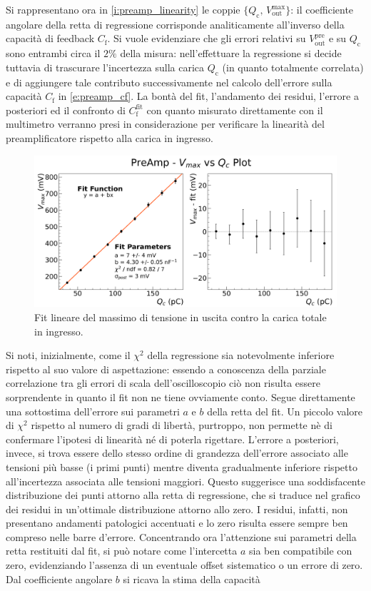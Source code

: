 \documentclass[a4paper,11pt]{article} %
\begin{document}
Si rappresentano ora in \autoref{i:preamp_linearity} le coppie $\{Q_{\text{c}},\,V^{\text{max}}_{\text{out}}\}$: il
coefficiente angolare della retta di regressione corrisponde analiticamente all'inverso della capacità di feedback
$C_{\text{f}}$. Si vuole evidenziare che gli errori relativi su $V^{\text{pre}}_{\text{out}}$ e su $Q_{\text{c}}$ sono
entrambi circa il $2\%$ della misura: nell'effettuare la regressione si decide tuttavia di trascurare l'incertezza sulla
carica $Q_{\text{c}}$ (in quanto totalmente correlata) e di aggiungere tale contributo successivamente nel calcolo
dell'errore sulla capacità $C_{\text{f}}$ in \autoref{e:preamp_cf}. La bontà del fit, l'andamento dei residui, l'errore
a posteriori ed il confronto di $C_{\text{f}}^{\text{fit}}$ con quanto misurato direttamente con il multimetro verranno
presi in considerazione per verificare la linearità del preamplificatore rispetto alla carica in ingresso. 
\vspace{-7pt}
\begin{figure}[H]
	\centering
	\includegraphics[width=0.8\linewidth]{../Plots/PreAmp/linearity_fit2.png}
	\vspace{-7pt}
	\caption{\small Fit lineare del massimo di tensione in uscita contro la carica totale in ingresso.}
	\label{i:preamp_linearity}
\end{figure}
\vspace{-7pt}
Si noti, inizialmente, come il $\chi^2$ della regressione sia notevolmente inferiore rispetto al suo valore di
aspettazione: essendo a conoscenza della parziale correlazione tra gli errori di scala dell'oscilloscopio ciò non
risulta essere sorprendente in quanto il fit non ne tiene ovviamente conto. Segue direttamente una sottostima
dell'errore sui parametri $a$ e $b$ della retta del fit. Un piccolo valore di $\chi^2$ rispetto al numero di gradi di
libertà, purtroppo, non permette nè di confermare l'ipotesi di linearità né di poterla rigettare. L'errore a posteriori,
invece, si trova essere dello stesso ordine di grandezza dell'errore associato alle tensioni più basse (i primi punti)
mentre diventa gradualmente inferiore rispetto all'incertezza associata alle tensioni maggiori. Questo suggerisce una
soddisfacente distribuzione dei punti attorno alla retta di regressione, che si traduce nel grafico dei residui in
un'ottimale distribuzione attorno allo zero. I residui, infatti, non presentano andamenti patologici accentuati e lo
zero risulta essere sempre ben compreso nelle barre d'errore. Concentrando ora l'attenzione sui parametri della retta
restituiti dal fit, si può notare come l'intercetta $a$ sia ben compatibile con zero, evidenziando l'assenza di un
eventuale offset sistematico o un errore di zero. Dal coefficiente angolare $b$ si ricava la stima della capacità
\end{document}
